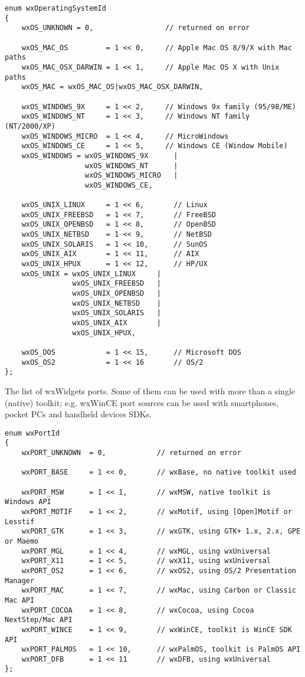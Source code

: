 \begin{verbatim}
enum wxOperatingSystemId
{
    wxOS_UNKNOWN = 0,                 // returned on error

    wxOS_MAC_OS         = 1 << 0,     // Apple Mac OS 8/9/X with Mac paths
    wxOS_MAC_OSX_DARWIN = 1 << 1,     // Apple Mac OS X with Unix paths
    wxOS_MAC = wxOS_MAC_OS|wxOS_MAC_OSX_DARWIN,

    wxOS_WINDOWS_9X     = 1 << 2,     // Windows 9x family (95/98/ME)
    wxOS_WINDOWS_NT     = 1 << 3,     // Windows NT family (NT/2000/XP)
    wxOS_WINDOWS_MICRO  = 1 << 4,     // MicroWindows
    wxOS_WINDOWS_CE     = 1 << 5,     // Windows CE (Window Mobile)
    wxOS_WINDOWS = wxOS_WINDOWS_9X      |
                   wxOS_WINDOWS_NT      |
                   wxOS_WINDOWS_MICRO   |
                   wxOS_WINDOWS_CE,

    wxOS_UNIX_LINUX     = 1 << 6,       // Linux
    wxOS_UNIX_FREEBSD   = 1 << 7,       // FreeBSD
    wxOS_UNIX_OPENBSD   = 1 << 8,       // OpenBSD
    wxOS_UNIX_NETBSD    = 1 << 9,       // NetBSD
    wxOS_UNIX_SOLARIS   = 1 << 10,      // SunOS
    wxOS_UNIX_AIX       = 1 << 11,      // AIX
    wxOS_UNIX_HPUX      = 1 << 12,      // HP/UX
    wxOS_UNIX = wxOS_UNIX_LINUX     |
                wxOS_UNIX_FREEBSD   |
                wxOS_UNIX_OPENBSD   |
                wxOS_UNIX_NETBSD    |
                wxOS_UNIX_SOLARIS   |
                wxOS_UNIX_AIX       |
                wxOS_UNIX_HPUX,

    wxOS_DOS            = 1 << 15,      // Microsoft DOS
    wxOS_OS2            = 1 << 16       // OS/2
};
\end{verbatim}

The list of wxWidgets ports. Some of them can be used with more than
a single (native) toolkit; e.g. wxWinCE port sources can be used with
smartphones, pocket PCs and handheld devices SDKs.

\begin{verbatim}
enum wxPortId
{
    wxPORT_UNKNOWN  = 0,            // returned on error

    wxPORT_BASE     = 1 << 0,       // wxBase, no native toolkit used

    wxPORT_MSW      = 1 << 1,       // wxMSW, native toolkit is Windows API
    wxPORT_MOTIF    = 1 << 2,       // wxMotif, using [Open]Motif or Lesstif
    wxPORT_GTK      = 1 << 3,       // wxGTK, using GTK+ 1.x, 2.x, GPE or Maemo
    wxPORT_MGL      = 1 << 4,       // wxMGL, using wxUniversal
    wxPORT_X11      = 1 << 5,       // wxX11, using wxUniversal
    wxPORT_OS2      = 1 << 6,       // wxOS2, using OS/2 Presentation Manager
    wxPORT_MAC      = 1 << 7,       // wxMac, using Carbon or Classic Mac API
    wxPORT_COCOA    = 1 << 8,       // wxCocoa, using Cocoa NextStep/Mac API
    wxPORT_WINCE    = 1 << 9,       // wxWinCE, toolkit is WinCE SDK API
    wxPORT_PALMOS   = 1 << 10,      // wxPalmOS, toolkit is PalmOS API
    wxPORT_DFB      = 1 << 11       // wxDFB, using wxUniversal
};
\end{verbatim}

